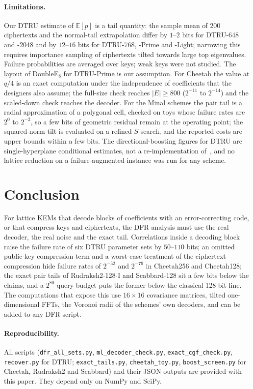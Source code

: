 \documentclass[11pt,a4paper]{article}
\theoremstyle{definition}
\theoremstyle{remark}
\newcommand{\E}{\mathbb{E}}
\begin{document}
\paragraph{Limitations.}
Our DTRU estimate of $\E[p]$ is a tail quantity: the sample mean of 200
ciphertexts and the normal-tail extrapolation differ by $1$--$2$ bits for
DTRU-648 and -2048 and by $12$--$16$ bits for DTRU-768, -Prime and -Light;
narrowing this requires importance sampling of ciphertexts tilted towards
large top eigenvalues. Failure probabilities are averaged over keys; weak
keys were not studied. The layout of DoubleE$_8$ for DTRU-Prime is our
assumption. For Cheetah the value at $q/4$ is an exact computation under
the independence of coefficients that the designers also assume; the
full-size check reaches $|E|\ge800$ ($2^{-11}$ to $2^{-14}$) and the
scaled-down check reaches the decoder. For the Minal schemes the pair tail
is a radial approximation of a polygonal cell, checked on toys whose
failure rates are $2^{0}$ to $2^{-2}$, so a few bits of geometric residual
remain at the operating point; the squared-norm tilt is evaluated on a
refined $S$ search, and the reported costs are upper bounds within a few
bits. The directional-boosting figures for DTRU are
single-hyperplane conditional estimates, not a re-implementation
of~\cite{DRV20}, and no lattice reduction on a failure-augmented instance
was run for any scheme.

\section{Conclusion}
For lattice KEMs that decode blocks of coefficients with an error-correcting
code, or that compress keys and ciphertexts, the DFR analysis must use the
real decoder, the real noise and the exact tail. Correlations inside a
decoding block raise the failure rate of six DTRU parameter sets by
$50$--$110$ bits; an omitted public-key compression term and a
worst-case treatment of the ciphertext compression hide failure rates of
$2^{-52}$ and $2^{-79}$ in Cheetah256 and Cheetah128; the exact pair
tails of Rudraksh2-128-I and Scabbard-128 sit a few bits below the claims,
and a $2^{80}$ query budget puts the former below the classical 128-bit
line. The computations that expose this use $16\times16$ covariance
matrices, tilted one-dimensional FFTs, the Voronoi radii of the schemes'
own decoders, and can be added to any DFR script.

\paragraph{Reproducibility.}
All scripts (\texttt{dfr\_all\_sets.py}, \texttt{ml\_decoder\_check.py},
\texttt{exact\_cgf\_check.py}, \texttt{recover.py} for DTRU;
\texttt{exact\_tails.py}, \texttt{cheetah\_toy.py}, \texttt{boost\_screen.py}
for Cheetah, Rudraksh2 and Scabbard) and their JSON outputs are provided with
this paper. They depend only on NumPy and SciPy.
\end{document}
